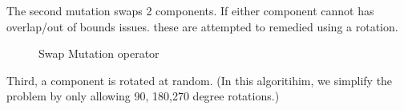 \documentclass{article}
\begin{document}
The second mutation swaps 2 components. If either component cannot has overlap/out of bounds issues. these are attempted to remedied using a rotation. 
\begin{figure}[ht]
\centering
{}
\caption{Swap Mutation operator}
\end{figure}

Third, a component is rotated at random. (In this algoritihim, we simplify the problem by only allowing 90, 180,270 degree rotations.)
\end{document}
